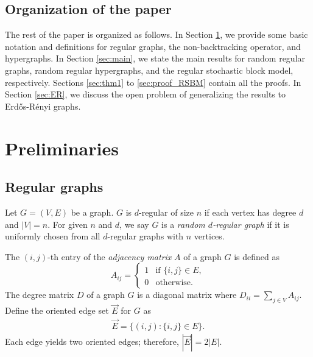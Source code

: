 \documentclass[11pt,reqno]{amsart}
\theoremstyle{definition}
\begin{document}
\subsection*{Organization of the paper}
The rest of the paper is organized as follows. In Section \ref{sec:prelim}, we provide some basic {notation} and definitions for regular graphs, the non-backtracking operator, and hypergraphs. In Section \ref{sec:main}, we state the main results for random regular graphs, random regular hypergraphs, and the regular stochastic block model, respectively. Sections \ref{sec:thm1} to \ref{sec:proof_RSBM} contain all the proofs. In Section \ref{sec:ER}, we discuss the open problem of generalizing the results to Erdős-Rényi graphs.







\section{Preliminaries}\label{sec:prelim}
\subsection{Regular graphs}
Let $G=(V,E)$ be a graph. $G$ is $d$-regular of size $n$ if each vertex has degree $d$ and $|V|=n$. For given $n$ and $d$, we say $G$ is a \textit{random $d$-regular graph} if it is uniformly chosen from all $d$-regular graphs with $n$ vertices.

The $(i,j)$-th entry of the \textit{adjacency matrix} $A$ of a graph $G$ is defined as 
\[ A_{ij}=\begin{cases} 
    1  &  \text{if } \{i,j\}\in E,\\
    0 & \text{otherwise.}
\end{cases}\]
The degree matrix $D$ of a graph $G$ is a diagonal matrix where $D_{ii}=\sum_{j\in V} A_{ij}$.
Define the oriented edge set $\vec{E}$ for $G$ as 
\begin{align} \label{eq:def_oriented}
\vec{E}= \{ (i,j): \{ i,j\} \in E\}.
\end{align}
Each edge yields two oriented edges; therefore, $|\vec{E}| =2|E|$. 
\end{document}
